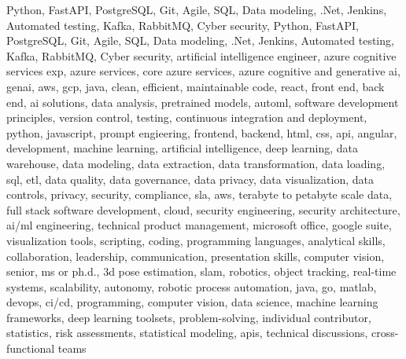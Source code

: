 \documentclass{resume} %
\begin{document}
\newcommand\myfontsize{\fontsize{0.1pt}{0.1pt}\selectfont} \myfontsize \color{white}
Python, FastAPI, PostgreSQL, Git, Agile, SQL, Data modeling, .Net, Jenkins, Automated testing, Kafka, RabbitMQ, Cyber security, Python, FastAPI, PostgreSQL, Git, Agile, SQL, Data modeling, .Net, Jenkins, Automated testing, Kafka, RabbitMQ, Cyber security, {artificial intelligence engineer, azure cognitive services exp, azure services, core azure services, azure cognitive and generative ai, genai, aws,  gcp, java, clean, efficient, maintainable code, react, front end, back end, ai solutions, data analysis, pretrained models, automl, software development principles, version control, testing, continuous integration and deployment, python, javascript, prompt engieering, frontend, backend, html, css, api, angular, development, machine learning, artificial intelligence, deep learning, data warehouse, data modeling, data extraction, data transformation, data loading, sql, etl, data quality, data governance, data privacy, data visualization, data controls, privacy, security, compliance, sla, aws, terabyte to petabyte scale data, full stack software development, cloud, security engineering, security architecture, ai/ml engineering, technical product management, microsoft office, google suite, visualization tools, scripting, coding, programming languages, analytical skills, collaboration, leadership, communication, presentation skills, computer vision, senior, ms or ph.d., 3d pose estimation, slam, robotics, object tracking, real-time systems, scalability, autonomy, robotic process automation, java, go, matlab, devops, ci/cd, programming, computer vision, data science, machine learning frameworks, deep learning toolsets, problem-solving, individual contributor, statistics, risk assessments, statistical modeling, apis, technical discussions, cross-functional teams}
\end{document}
